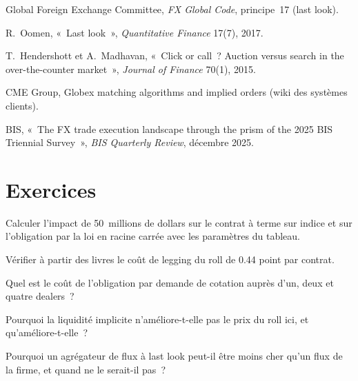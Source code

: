 \begin{omsources}
\item Global Foreign Exchange Committee, \emph{FX Global Code}, principe~17 (last look).
\item R.~Oomen, «~Last look~», \emph{Quantitative Finance} 17(7), 2017.
\item T.~Hendershott et A.~Madhavan, «~Click or call~? Auction versus search in the over-the-counter market~», \emph{Journal of Finance} 70(1),
2015.
\item CME Group, Globex matching algorithms and implied orders (wiki des systèmes clients).
\item BIS, «~The FX trade execution landscape through the prism of the 2025 BIS Triennial Survey~», \emph{BIS Quarterly Review}, décembre 2025.
\end{omsources}

\section{Exercices}

\begin{exercise}[$\star$]\label{exo:mx:execution-beyond-equities:1}
Calculer l'impact de 50~millions de dollars sur le contrat à terme sur indice et sur l'obligation par la loi en racine carrée avec les paramètres du tableau.
\end{exercise}

\begin{exercise}[$\star$]\label{exo:mx:execution-beyond-equities:2}
Vérifier à partir des livres le coût de legging du roll de 0.44 point par contrat.
\end{exercise}

\begin{exercise}[$\star$]\label{exo:mx:execution-beyond-equities:3}
Quel est le coût de l'obligation par demande de cotation auprès d'un, deux et quatre dealers~?
\end{exercise}

\begin{exercise}[$\star\star$]\label{exo:mx:execution-beyond-equities:4}
Pourquoi la liquidité implicite n'améliore-t-elle pas le prix du roll ici, et qu'améliore-t-elle~?
\end{exercise}

\begin{exercise}[$\star\star$]\label{exo:mx:execution-beyond-equities:5}
Pourquoi un agrégateur de flux à last look peut-il être moins cher qu'un flux de la firme, et quand ne le serait-il pas~?
\end{exercise}

